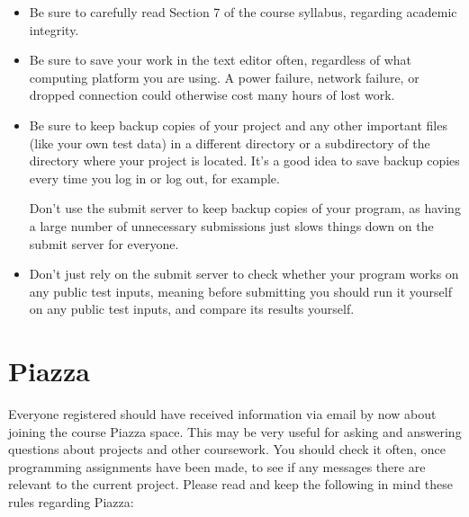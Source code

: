 \documentclass[10pt]{article}
\begin{document}
    \begin{itemize}

      \addtolength{\itemsep}{-.25mm}

      \item Be sure to carefully read Section 7 of the course syllabus,
            regarding academic integrity.

      \item Be sure to save your work in the text editor often, regardless of
            what computing platform you are using.  A power failure, network
            failure, or dropped connection could otherwise cost many hours of
            lost work.

      \item Be sure to keep backup copies of your project and any other
            important files (like your own test data) in a different
            directory or a subdirectory of the directory where your project
            is located.  It's a good idea to save backup copies every time
            you log in or log out, for example.

            Don't use the submit server to keep backup copies of your
            program, as having a large number of unnecessary submissions
            just slows things down on the submit server for everyone.

      \item Don't just rely on the submit server to check whether your
            program works on any public test inputs, meaning before
            submitting you should run it yourself on any public test inputs,
            and compare its results yourself.

    \end{itemize}

    \vspace{-2.5mm}

  \section{Piazza}

    Everyone registered should have received information via email by now
  about joining the course Piazza space.  This may be very useful for asking
  and answering questions about projects and other coursework.  You should
  check it often, once programming assignments have been made, to see if any
  messages there are relevant to the current project.  Please read and keep
  the following in mind these rules regarding Piazza:
\end{document}
